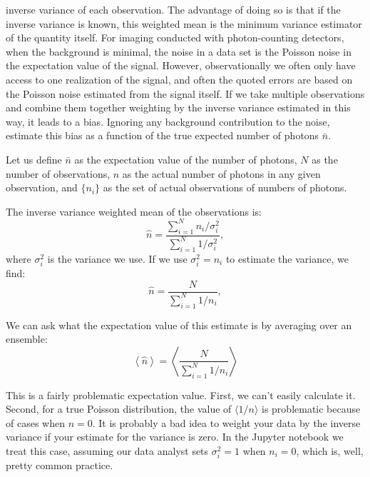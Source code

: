 \begin{enumerate}
inverse variance of each observation. The advantage of doing so is
that if the inverse variance is known, this weighted mean is the
minimum variance estimator of the quantity itself. For imaging
conducted with photon-counting detectors, when the background is
minimal, the noise in a data set is the Poisson noise in
the expectation value of the signal. However, observationally we often
only have access to one realization of the signal, and often the
quoted errors are based on the Poisson noise estimated from the signal
itself. If we take multiple observations and combine them together
weighting by the inverse variance estimated in this way, it leads to a
bias. Ignoring any background contribution to the noise, estimate this
bias as a function of the true expected number of photons $\bar n$.

\begin{answer}
Let us define $\bar n$ as the expectation value of the number of
photons, $N$ as the number of observations, $n$ as the actual number
of photons in any given observation, and $\{n_i\}$ as the set of
actual observations of numbers of photons.

The inverse variance weighted mean of the observations is:
\begin{equation}
{\hat n} = \frac{\sum_{i=1}^N n_i / \sigma_i^2}
{\sum_{i=1}^N 1 / \sigma_i^2},
\end{equation}
where $\sigma_i^2$ is the variance we use. If we use $\sigma_i^2 =
n_i$ to estimate the variance, we find:
\begin{equation}
{\hat n} = \frac{N}{\sum_{i=1}^N 1 / n_i},
\end{equation}

We can ask what the expectation value of this estimate is by averaging
over an ensemble:
\begin{equation}
\left\langle {\hat n} \right\rangle
= \left\langle \frac{N}{\sum_{i=1}^N 1 / n_i} \right\rangle
\end{equation}

This is a fairly problematic expectation value. First, we can't easily
calculate it. Second, for a true Poisson distribution, the value of
$\langle 1/n\rangle$ is problematic because of cases when $n=0$. It is
probably a bad idea to weight your data by the inverse variance if
your estimate for the variance is zero. In the Jupyter notebook we
treat this case, assuming our data analyst sets $\sigma_i^2 = 1$ when
$n_i=0$, which is, well, pretty common practice.


\end{answer}
\end{enumerate}
